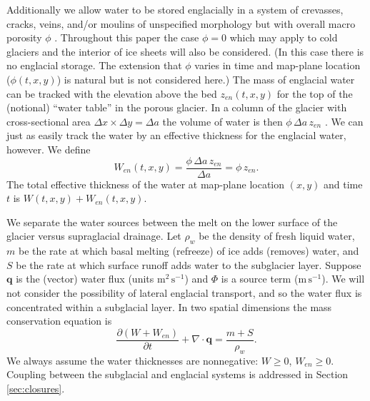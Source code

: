 \documentclass[11pt,final]{amsart}
\newcommand\bq{\mathbf{q}}
\newcommand{\Div}{\nabla\cdot}
\begin{document}
Additionally we allow water to be stored englacially in a system of crevasses, cracks, veins, and/or moulins of unspecified morphology but with overall macro porosity $\phi$ \citep{Bartholomausetal2011}.  Throughout this paper the case $\phi=0$ which may apply to cold glaciers and the interior of ice sheets will also be considered.  (In this case there is no englacial storage.  The extension that $\phi$ varies in time and map-plane location ($\phi(t,x,y)$) is natural but is not considered here.)  The mass of englacial water can be tracked with the elevation above the bed $z_{en}(t,x,y)$ for the top of the (notional) ``water table'' in the porous glacier.  In a column of the glacier with cross-sectional area $\Delta x \times \Delta y = \Delta a$ the volume of water is then $\phi\, \Delta a \, z_{en}$ \citep{Bartholomausetal2011}.  We can just as easily track the water by an effective thickness for the englacial water, however.  We define
\begin{equation}
W_{en}(t,x,y) = \frac{\phi\, \Delta a\, z_{en}}{\Delta a} = \phi\, z_{en}. \label{eq:definezen}
\end{equation}
The total effective thickness of the water at map-plane location $(x,y)$ and time $t$ is $W(t,x,y)+W_{en}(t,x,y)$.

We separate the water sources between the melt on the lower surface of the glacier versus supraglacial drainage.  Let $\rho_w$ be the density of fresh liquid water, $m$ be the rate at which basal melting (refreeze) of ice adds (removes) water, and $S$ be the rate at which surface runoff adds water to the subglacier layer.  Suppose $\bq$ is the (vector) water flux (units $\text{m}^2\,\text{s}^{-1}$) and $\Phi$ is a source term ($\text{m}\,\text{s}^{-1}$).  We will not consider the possibility of lateral englacial transport, and so the water flux is concentrated within a subglacial layer.  In two spatial dimensions the mass conservation equation is \citep{Clarke05}
\begin{equation} \label{eq:conserve}
\frac{\partial (W + W_{en})}{\partial t} + \Div \bq = \frac{m+S}{\rho_w}.
\end{equation}
We always assume the water thicknesses are nonnegative: $W \ge 0$, $W_{en} \ge 0$.  Coupling between the subglacial and englacial systems is addressed in Section \ref{sec:closures}.
\end{document}
